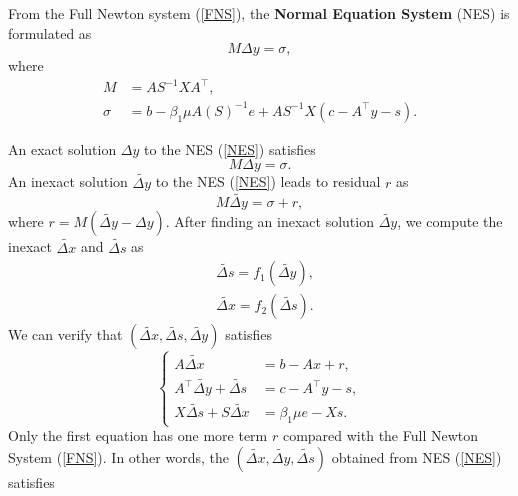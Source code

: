 \begin{definition}
From the Full Newton system (\ref{FNS}), the \textbf{Normal Equation System} (NES) is formulated as
\begin{equation}
    \label{NES}
    M \Delta y=\sigma,
\end{equation}
where
\begin{equation}
\begin{aligned}
    M & = A S^{-1} X A^{\top} ,\\
    \sigma & =b-\beta_1 \mu A\left(S\right)^{-1} e+AS^{-1}X\left(c-A^{\top} y-s\right).
\end{aligned}
\end{equation}
\end{definition}
An exact solution $\Delta y$ to the NES (\ref{NES}) satisfies
\begin{equation}
    M \Delta y = \sigma.
\end{equation}
An inexact solution $\widetilde{\Delta y}$ to the NES (\ref{NES}) leads to residual $r$ as
\begin{equation}
    M \widetilde{\Delta y} = \sigma+r,
\end{equation}
where $r=M\left(\widetilde{\Delta y}-\Delta y\right)$. After finding an inexact solution $\widetilde{\Delta y}$, we compute the inexact $\widetilde{\Delta x}$ and $\widetilde{\Delta s}$ as
\begin{equation}
\begin{aligned}
    & \widetilde{\Delta s} = f_1(\widetilde{\Delta y}), \\
    & \widetilde{\Delta x} = f_2(\widetilde{\Delta s}).
\end{aligned}
\end{equation}
We can verify that $\left(\widetilde{\Delta x}, \widetilde{\Delta s}, \widetilde{\Delta y}\right)$ satisfies
\begin{equation}
\left\{
\begin{aligned}
    A \widetilde{\Delta x} & =b-A x +r, \\
    A^{\top} \widetilde{\Delta y}+\widetilde{\Delta s} & =c-A^{\top} y-s, \\
    X \widetilde{\Delta s}+S \widetilde{\Delta x} & =\beta_1 \mu e-X s .
\end{aligned}
\right.
\end{equation}
Only the first equation has one more term $r$ compared with the Full Newton System (\ref{FNS}). In other words, the $(\widetilde{\Delta x} , \widetilde{\Delta y} , \widetilde{\Delta s} )$ obtained from NES (\ref{NES}) satisfies
